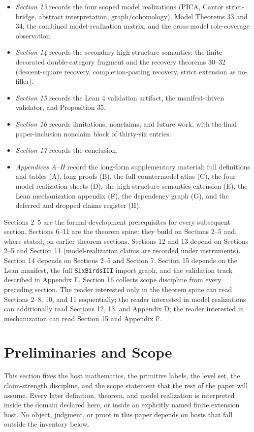 \documentclass[11pt]{article}
\theoremstyle{definition}
\begin{document}
\begin{itemize}
\item
  \emph{Section 13} records the four scoped model realizations (PICA, Cantor strict-bridge, abstract interpretation, graph/cohomology), Model Theorems 33 and 34, the combined model-realization matrix, and the cross-model role-coverage observation.
\item
  \emph{Section 14} records the secondary high-structure semantics: the finite decorated double-category fragment and the recovery theorems 30--32 (descent-square recovery, completion-pasting recovery, strict extension as no-filler).
\item
  \emph{Section 15} records the Lean 4 validation artifact, the manifest-driven validator, and Proposition 35.
\item
  \emph{Section 16} records limitations, nonclaims, and future work, with the final paper-inclusion nonclaim block of thirty-six entries.
\item
  \emph{Section 17} records the conclusion.
\item
  \emph{Appendices A--H} record the long-form supplementary material: full definitions and tables (A), long proofs (B), the full countermodel atlas (C), the four model-realization sheets (D), the high-structure semantics extension (E), the Lean mechanization appendix (F), the dependency graph (G), and the deferred and dropped claims register (H).
\end{itemize}

Sections 2--5 are the formal-development prerequisites for every subsequent section. Sections 6--11 are the theorem spine: they build on Sections 2--5 and, where stated, on earlier theorem sections. Sections 12 and 13 depend on Sections 2--5 and Section 11 (model-realization claims are recorded under instruments). Section 14 depends on Sections 2--5 and Section 7. Section 15 depends on the Lean manifest, the full \texttt{SixBirdsIII} import graph, and the validation track described in Appendix F. Section 16 collects scope discipline from every preceding section. The reader interested only in the theorem spine can read Sections 2--8, 10, and 11 sequentially; the reader interested in model realizations can additionally read Sections 12, 13, and Appendix D; the reader interested in mechanization can read Section 15 and Appendix F.
 \section{Preliminaries and Scope}

This section fixes the host mathematics, the primitive labels, the level set, the claim-strength discipline, and the scope statement that the rest of the paper will assume. Every later definition, theorem, and model realization is interpreted inside the domain declared here, or inside an explicitly named finite extension host. No object, judgment, or proof in this paper depends on hosts that fall outside the inventory below.
\end{document}
